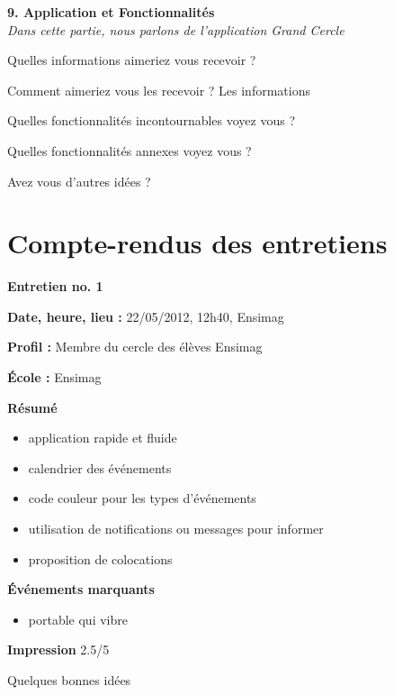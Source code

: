 \documentclass[a4paper, 11px]{article}
\begin{document}
\vspace{.3cm}

 \textbf {\large 9. Application et Fonctionnalités}\\
\textit{Dans cette partie, nous parlons de l'application Grand Cercle}

Quelles informations aimeriez vous recevoir ?


Comment aimeriez vous les recevoir ?
Les informations


Quelles fonctionnalités incontournables voyez vous ?


Quelles fonctionnalités annexes voyez vous ?


Avez vous d'autres idées ?

\newpage

\section{Compte-rendus des entretiens}

 \textbf {\large Entretien no. 1}

\textbf{Date, heure, lieu : }
22/05/2012, 12h40, Ensimag

\textbf{Profil : }
Membre du cercle des élèves Ensimag

\textbf{École : }
Ensimag

\textbf{Résumé}

	\begin{itemize}
		\item application rapide et fluide
		\item calendrier des événements
		\item code couleur pour les types d'événements
		\item utilisation de notifications ou messages pour informer
		\item proposition de colocations
	\end{itemize}

\vspace{.25cm}
\textbf{Événements marquants}	
	\begin{itemize}
		\item portable qui vibre
	\end{itemize}

\vspace{.25cm}
\textbf{Impression} 2.5/5 

Quelques bonnes idées



\vspace{.3cm}
\end{document}
